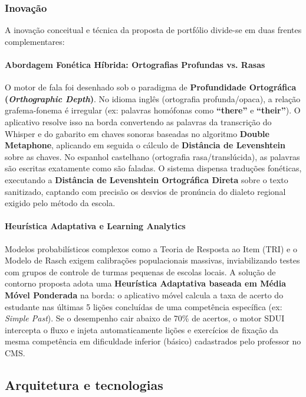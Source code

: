 \documentclass[portuguese]{sbcreviews-2025}%
\begin{document}
\subsubsection{Inovação}
\label{sec:inovacao}

A inovação conceitual e técnica da proposta de portfólio divide-se em duas frentes complementares:

\paragraph{Abordagem Fonética Híbrida: Ortografias Profundas vs. Rasas} O motor de fala foi desenhado sob o paradigma de \textbf{Profundidade Ortográfica (\textit{Orthographic Depth})}. No idioma inglês (ortografia profunda/opaca), a relação grafema-fonema é irregular (ex: palavras homófonas como \textbf{``there''} e \textbf{``their''}). O aplicativo resolve isso na borda convertendo as palavras da transcrição do Whisper e do gabarito em chaves sonoras baseadas no algoritmo \textbf{Double Metaphone}, aplicando em seguida o cálculo de \textbf{Distância de Levenshtein} sobre as chaves. No espanhol castelhano (ortografia rasa/translúcida), as palavras são escritas exatamente como são faladas. O sistema dispensa traduções fonéticas, executando a \textbf{Distância de Levenshtein Ortográfica Direta} sobre o texto sanitizado, captando com precisão os desvios de pronúncia do dialeto regional exigido pelo método da escola.

\paragraph{Heurística Adaptativa e Learning Analytics} Modelos probabilísticos complexos como a Teoria de Resposta ao Item (TRI) e o Modelo de Rasch exigem calibrações populacionais massivas, inviabilizando testes com grupos de controle de turmas pequenas de escolas locais. A solução de contorno proposta adota uma \textbf{Heurística Adaptativa baseada em Média Móvel Ponderada} na borda: o aplicativo móvel calcula a taxa de acerto do estudante nas últimas 5 lições concluídas de uma competência específica (ex: \textit{Simple Past}). Se o desempenho cair abaixo de 70\% de acertos, o motor SDUI intercepta o fluxo e injeta automaticamente lições e exercícios de fixação da mesma competência em dificuldade inferior (básico) cadastrados pelo professor no CMS.

\subsection{Arquitetura e tecnologias}
\label{sec:arqtec}
\end{document}
